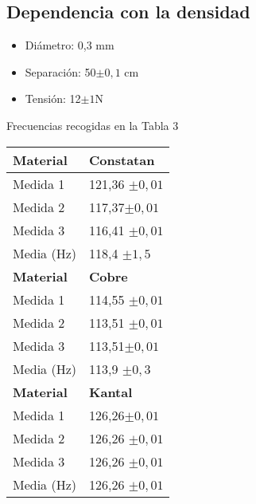 \documentclass[a4paper,12pt,spanish]{article}
\begin{document}
 \subsection{Dependencia con la densidad}

\begin{itemize}
	\item{Diámetro: 0,3 mm}
	\item{Separación: 50$\pm 0,1$ cm}
	\item{Tensión: 12$\pm 1$N}
\end{itemize}

Frecuencias recogidas en la Tabla 3



\begin{table}[H]
	\begin{minipage}[t]{.48\linewidth}
		\centering
		\begin{tabular}{|l|l|}
			\hline
			\textbf{Material} & \textbf{Constatan} \\ \hline
			Medida 1          & 121,36  $\pm 0,01$         \\ \hline
			Medida 2          & 117,37$\pm 0,01$            \\ \hline
			Medida 3          & 116,41 $\pm 0,01$          \\ \hline
			Media (Hz)         & 118,4   $\pm 1,5$        \\ \hline\hline
			\textbf{Material} & \textbf{Cobre}     \\ \hline
			Medida 1          & 114,55 $\pm 0,01$           \\ \hline
			Medida 2          & 113,51 $\pm 0,01$           \\ \hline
			Medida 3          & 113,51$\pm 0,01$           \\ \hline
			Media (Hz)         & 113,9  $\pm 0,3$         \\ \hline\hline
			\textbf{Material} & \textbf{Kantal}    \\ \hline
			Medida 1          & 126,26$\pm 0,01$            \\ \hline
			Medida 2          &126,26 $\pm 0,01$           \\ \hline
			Medida 3          & 126,26  $\pm 0,01$          \\ \hline
			Media (Hz)         & 126,26  $\pm 0,01$          \\ \hline
		\end{tabular}
		

\end{minipage}
\end{table}
\end{document}
